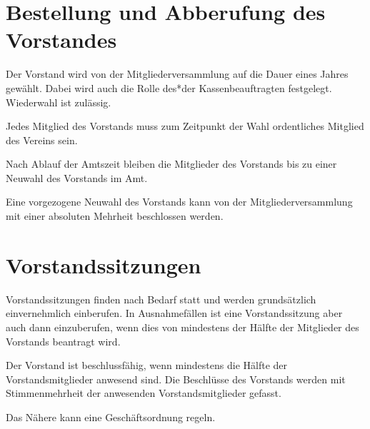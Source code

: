 \section{Bestellung und Abberufung des Vorstandes}
\begin{absätze}
    \item Der Vorstand wird von der Mitgliederversammlung auf die Dauer eines Jahres gewählt. Dabei wird auch die Rolle des*der Kassenbeauftragten festgelegt. Wiederwahl ist zulässig.
    \item Jedes Mitglied des Vorstands muss zum Zeitpunkt der Wahl ordentliches Mitglied des Vereins sein.
    \item Nach Ablauf der Amtszeit bleiben die Mitglieder des Vorstands bis zu einer Neuwahl des Vorstands im Amt.
    \item Eine vorgezogene Neuwahl des Vorstands kann von der Mitgliederversammlung mit einer absoluten Mehrheit beschlossen werden.
\end{absätze}

\section{Vorstandssitzungen}
\begin{absätze}
    \item Vorstandssitzungen finden nach Bedarf statt und werden grundsätzlich einvernehmlich einberufen. In Ausnahmefällen ist eine Vorstandssitzung aber auch dann einzuberufen, wenn dies von mindestens der Hälfte der Mitglieder des Vorstands beantragt wird.
    \item Der Vorstand ist beschlussfähig, wenn mindestens die Hälfte der Vorstandsmitglieder anwesend sind. Die Beschlüsse des Vorstands werden mit Stimmenmehrheit der anwesenden Vorstandsmitglieder gefasst.
    \item Das Nähere kann eine Geschäftsordnung regeln.
\end{absätze}
